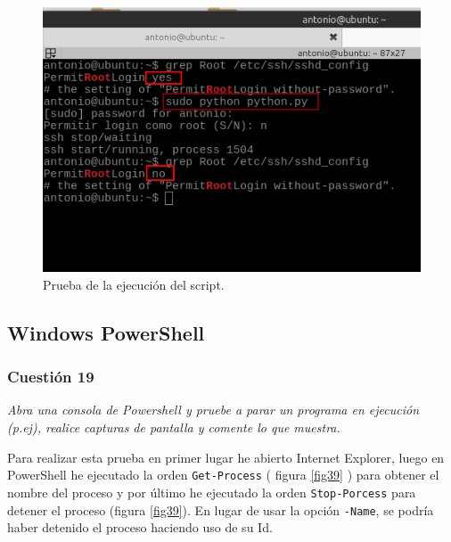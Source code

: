 \begin{figure}[H]
    \begin{center}
    \advance\leftskip-1cm
        \includegraphics[scale=0.5]{imagenes/img55}
        \caption{Prueba de la ejecución del script.}
        \label{fig50}
    \end{center}
\end{figure}


\subsection{Windows PowerShell}
\subsubsection{Cuestión 19}
\textit{Abra una consola de Powershell y pruebe a parar un programa en ejecución (p.ej), realice capturas de pantalla y comente lo que muestra.}
\newline

Para realizar esta prueba en primer lugar he abierto Internet Explorer, luego en PowerShell he ejecutado la orden \texttt{Get-Process} \cite{gpps} ( figura \ref{fig39} ) para obtener el nombre del proceso y por último he ejecutado la orden \texttt{Stop-Porcess} \cite{spps} para detener el proceso (figura \ref{fig39}). En lugar de usar la opción \texttt{-Name}, se podría haber detenido el proceso haciendo uso de su Id. 

